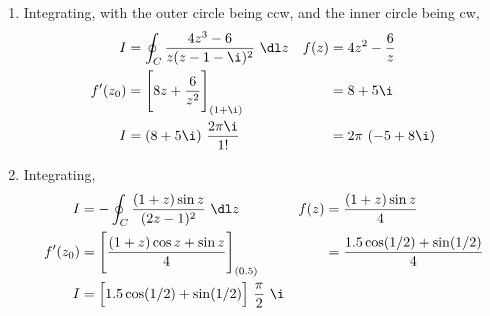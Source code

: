 \begin{enumerate}
    \item Integrating, with the outer circle being ccw, and the inner circle being cw,
          \begin{align}
              I       & = \oint_C \frac{4z^3 - 6}{ z(z - 1 - \i)^2}\ \dl z &
              f(z)    & = 4z^2 - \frac{6}{z}                                 \\
              f'(z_0) & = \Bigg[ 8z + \frac{6}{z^2} \Bigg]_{(1 + \i)}      &
                      & = 8 + 5\i                                            \\
              I       & = (8 + 5\i)\ \frac{2\pi\i}{1!}                     &
                      & = 2\pi\ (-5 + 8\i)
          \end{align}

    \item Integrating,
          \begin{align}
              I       & = -\oint_C \frac{(1+z)\sin z}{(2z - 1)^2}\ \dl z        &
              f(z)    & = \frac{(1+z)\sin z}{4}                                   \\
              f'(z_0) & = \Bigg[ \frac{(1+z)\cos z + \sin z}{4} \Bigg]_{(0.5)}  &
                      & = \frac{1.5 \cos(1/2) + \sin(1/2)}{4}                     \\
              I       & = \Big[1.5\cos(1/2) + \sin(1/2)\Big]\ \frac{\pi}{2}\ \i
          \end{align}


\end{enumerate}
